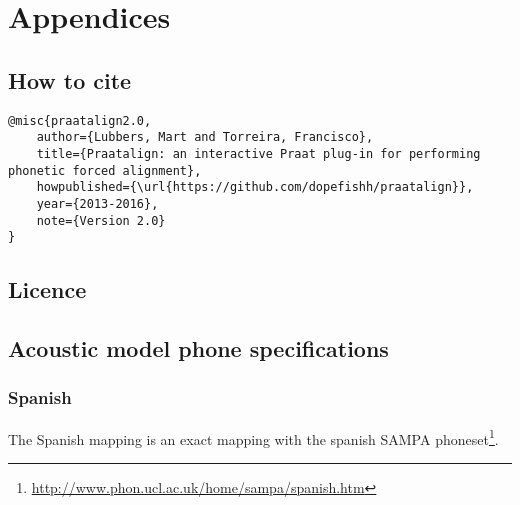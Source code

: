 \chapter{Appendices}
\section{How to cite}
\begin{lstlisting}[caption={Bibtex snippet}]
@misc{praatalign2.0,
	author={Lubbers, Mart and Torreira, Francisco},
	title={Praatalign: an interactive Praat plug-in for performing phonetic forced alignment},
	howpublished={\url{https://github.com/dopefishh/praatalign}},
	year={2013-2016},
	note={Version 2.0}
}
\end{lstlisting}

\section{Licence}


\section{Acoustic model phone specifications}\label{sec:models}
\subsection{Spanish}\label{sec:phspanish}
The Spanish mapping is an exact mapping with the spanish SAMPA
phoneset\footnote{\url{http://www.phon.ucl.ac.uk/home/sampa/spanish.htm}}.

